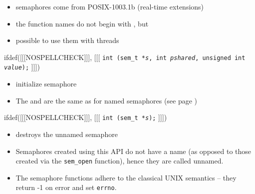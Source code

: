 \begin{slide}
\begin{itemize}
\item semaphores come from POSIX-1003.1b (real-time extensions)
\item the function names do not begin with ,
but 
\item possible to use them with threads
\end{itemize}
ifdef([[[NOSPELLCHECK]]], [[[
\texttt{int (sem\_t *\emph{s},
int \emph{pshared}, unsigned int \emph{value});}
]]])
\begin{itemize}
\item initialize semaphore
\item The  and  are the same as for named
semaphores (see page \pageref{NAMED_SEMAPHORES})
\end{itemize}
ifdef([[[NOSPELLCHECK]]], [[[
\texttt{int (sem\_t *\emph{s});}
]]])
\begin{itemize}
\item destroys the unnamed semaphore
\end{itemize}
\end{slide}

\begin{itemize}
\item Semaphores created using this API do not have a name (as opposed to
those created via the \texttt{sem\_open} function), hence they are called
unnamed.
\item The semaphore functions adhere to the classical UNIX semantics --
they return -1 on error and set \texttt{errno}.
\end{itemize}


